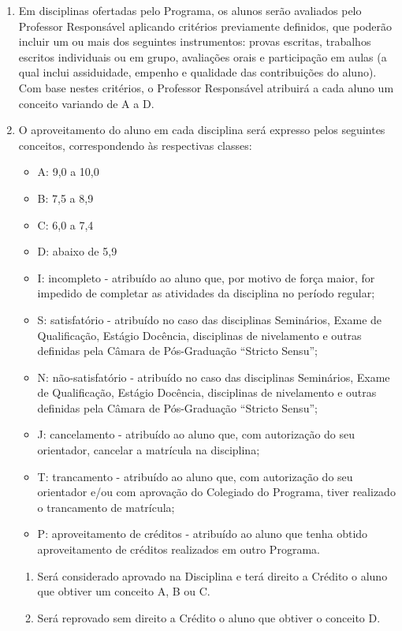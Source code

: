 \documentclass{article}
\newcommand{\grupoMenor}{Colegiado\xspace}
\begin{document}
\begin{enumerate}
	\item Em disciplinas ofertadas pelo Programa, os alunos serão avaliados pelo Professor Responsável aplicando critérios previamente definidos, que poderão incluir um ou mais dos seguintes instrumentos: provas escritas, trabalhos escritos individuais ou em grupo, avaliações orais e participação em aulas (a qual inclui assiduidade, empenho e qualidade das contribuições do aluno). Com base nestes critérios, o Professor Responsável atribuirá a cada aluno um conceito variando de A a D.
	
	\item O aproveitamento do aluno em cada disciplina será expresso pelos seguintes conceitos, correspondendo às respectivas classes:
	\begin{itemize}
		\item A: 9,0 a 10,0
		\item B: 7,5 a 8,9
		\item C: 6,0 a 7,4 
		\item D: abaixo de 5,9
		\item I: incompleto - atribuído ao aluno que, por motivo de força maior, for impedido de completar as atividades da disciplina no período regular;
		\item S: satisfatório - atribuído no caso das disciplinas Seminários, Exame de Qualificação, Estágio Docência, disciplinas de nivelamento e outras definidas pela Câmara de Pós-Graduação ``Stricto Sensu'';
		\item N: não-satisfatório - atribuído no caso das disciplinas Seminários, Exame de Qualificação, Estágio Docência, disciplinas de nivelamento e outras definidas pela Câmara de Pós-Graduação ``Stricto Sensu'';
		\item J: cancelamento - atribuído ao aluno que, com autorização do seu orientador, cancelar a matrícula na disciplina;
		\item T: trancamento - atribuído ao aluno que, com autorização do seu orientador e/ou com aprovação do \grupoMenor do Programa, tiver realizado o trancamento de matrícula;
		\item P: aproveitamento de créditos - atribuído ao aluno que tenha obtido aproveitamento de créditos realizados em outro Programa.
	\end{itemize}
	\begin{enumerate}
		\item Será considerado aprovado na Disciplina e terá direito a Crédito o aluno que obtiver um conceito A, B ou C.
		\item Será reprovado sem direito a Crédito o aluno que obtiver o conceito D.
	\end{enumerate}


\end{enumerate}
\end{document}
